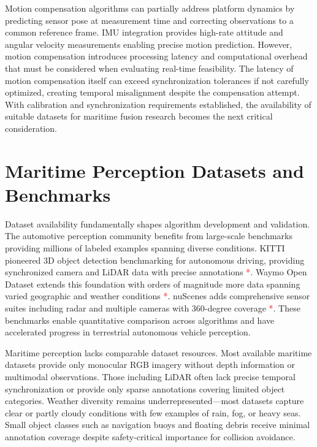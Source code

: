 \documentclass[../main.tex]{subfiles}
\begin{document}
Motion compensation algorithms can partially address platform dynamics by predicting sensor pose at measurement time and correcting observations to a common reference frame. IMU integration provides high-rate attitude and angular velocity measurements enabling precise motion prediction. However, motion compensation introduces processing latency and computational overhead that must be considered when evaluating real-time feasibility. The latency of motion compensation itself can exceed synchronization tolerances if not carefully optimized, creating temporal misalignment despite the compensation attempt. With calibration and synchronization requirements established, the availability of suitable datasets for maritime fusion research becomes the next critical consideration.

\section{Maritime Perception Datasets and Benchmarks}

Dataset availability fundamentally shapes algorithm development and validation. The automotive perception community benefits from large-scale benchmarks providing millions of labeled examples spanning diverse conditions. KITTI pioneered 3D object detection benchmarking for autonomous driving, providing synchronized camera and LiDAR data with precise annotations \textcolor{red}{*}. Waymo Open Dataset extends this foundation with orders of magnitude more data spanning varied geographic and weather conditions \textcolor{red}{*}. nuScenes adds comprehensive sensor suites including radar and multiple cameras with 360-degree coverage \textcolor{red}{*}. These benchmarks enable quantitative comparison across algorithms and have accelerated progress in terrestrial autonomous vehicle perception.

Maritime perception lacks comparable dataset resources. Most available maritime datasets provide only monocular RGB imagery without depth information or multimodal observations. Those including LiDAR often lack precise temporal synchronization or provide only sparse annotations covering limited object categories. Weather diversity remains underrepresented—most datasets capture clear or partly cloudy conditions with few examples of rain, fog, or heavy seas. Small object classes such as navigation buoys and floating debris receive minimal annotation coverage despite safety-critical importance for collision avoidance.
\end{document}
